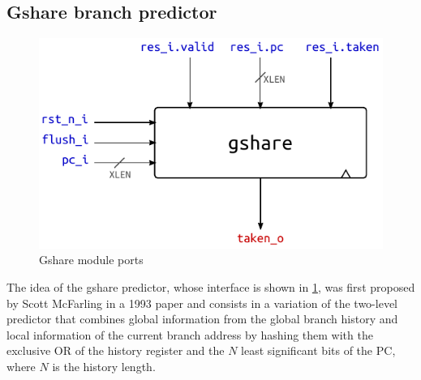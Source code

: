 \subsection{Gshare branch predictor}\label{sec:gshare}
\begin{figure}[hbt]
  \centering
  \includegraphics{img/gshare-top.pdf}
  \caption{Gshare module ports}
  \label{fig:gshare-top}
\end{figure}
The idea of the gshare predictor, whose interface is shown in \cref{fig:gshare-top}, was first proposed by Scott McFarling in a 1993 paper \cite{mcfarling93} and consists in a variation of the two-level predictor that combines global information from the global branch history and local information of the current branch address by hashing them with the exclusive OR of the history register and the $N$ least significant bits of the \ac{PC}, where $N$ is the history length. 

